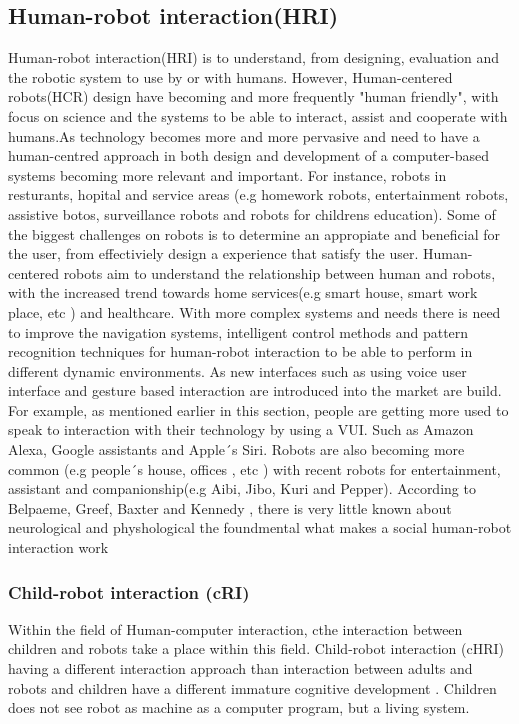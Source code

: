 \documentclass[fleqn,10pt]{wlscirep}
\begin{document}
\subsection{Human-robot interaction(HRI)}
Human-robot interaction(HRI) is to understand, from designing, evaluation and the robotic system to use by or with humans\cite{etellerannet}. However, Human-centered robots(HCR) design have becoming and more frequently "human friendly", with focus on science and the systems to be able to interact, assist and cooperate with humans.As technology becomes more and more pervasive and need to have a human-centred approach in both design and development of a computer-based systems becoming more relevant and important. For instance, robots in resturants, hopital and service areas (e.g homework robots, entertainment robots, assistive botos, surveillance robots and robots for childrens  education). Some of the biggest challenges on robots is to determine an appropiate and beneficial for the user, from effectiviely design a experience that satisfy the user\cite{Willies}. Human-centered robots aim to understand the relationship between human and robots, with the increased trend towards home services(e.g smart house, smart work place, etc ) and healthcare. With more complex  systems and needs there is need to improve the navigation systems, intelligent control methods and pattern recognition techniques for human-robot interaction to be able to perform in different dynamic environments\cite{He-Li-Chen}.
As new interfaces such as using voice user interface and gesture based interaction are introduced into the market are build. For example, as mentioned earlier in this section, people are getting more used to speak to interaction with their technology by using a VUI. Such as  Amazon Alexa, Google assistants and Apple´s Siri. Robots are also becoming more common (e.g people´s house, offices , etc ) with recent robots for entertainment, assistant and companionship(e.g Aibi, Jibo, Kuri and Pepper). According to Belpaeme, Greef, Baxter and Kennedy \cite{Baxter}, there is very little known about neurological and physhological the foundmental what makes a social human-robot interaction work

\subsubsection{Child-robot interaction (cRI)}
Within the field of Human-computer interaction, cthe interaction between children and robots take a place within this field. Child-robot interaction (cHRI) having a different interaction approach than interaction between adults and robots and children have a different immature  cognitive development \cite{Baxter}. Children does not see robot as machine as a  computer program, but a living system. 
\end{document}
